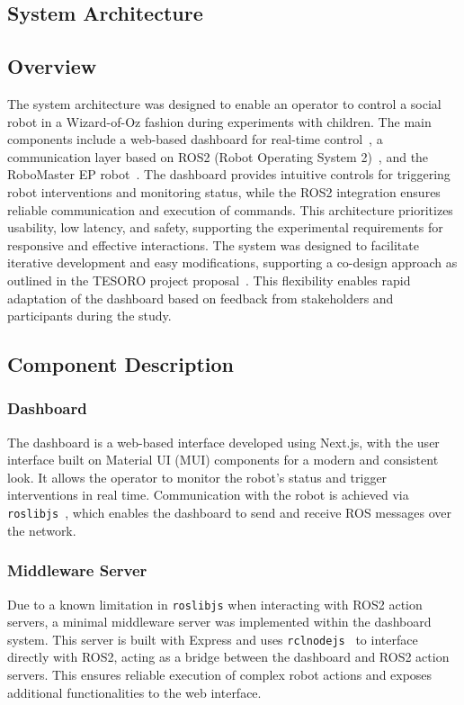 \documentclass[a4paper]{usiinfbachelorproject}
\begin{document}
\subsection{\textbf{System Architecture}}
\subsection*{\textbf{Overview}}
The system architecture was designed to enable an operator to control a social robot in a Wizard-of-Oz fashion during experiments with children.
The main components include a web-based dashboard for real-time control~\cite{frovaaa2025hogwarts}, a communication layer based on ROS2 (Robot Operating System 2)~\cite{ros2, frovaaa2025robomaster, frovaaa2025robomasterhri}, and the RoboMaster EP robot~\cite{djirobomasterep}.
The dashboard provides intuitive controls for triggering robot interventions and monitoring status, while the ROS2 integration ensures reliable communication and execution of commands.
This architecture prioritizes usability, low latency, and safety, supporting the experimental requirements for responsive and effective interactions.
The system was designed to facilitate iterative development and easy modifications, supporting a co-design approach as outlined in the TESORO project proposal~\cite{landoni2025tesoro}.
This flexibility enables rapid adaptation of the dashboard based on feedback from stakeholders and participants during the study.

\subsection{\textbf{Component Description}}
\subsubsection*{\textbf{Dashboard}}
The dashboard is a web-based interface developed using Next.js, with the user interface built on Material UI (MUI) components for a modern and consistent look.
It allows the operator to monitor the robot's status and trigger interventions in real time. Communication with the robot is achieved via \texttt{roslibjs}~\cite{roslibjs}, which enables the dashboard to send and receive ROS messages over the network.

\subsubsection*{\textbf{Middleware Server}}
Due to a known limitation in \texttt{roslibjs} when interacting with ROS2 action servers, a minimal middleware server was implemented within the dashboard system.
This server is built with Express and uses \texttt{rclnodejs}~\cite{rclnodejs} to interface directly with ROS2, acting as a bridge between the dashboard and ROS2 action servers.
This ensures reliable execution of complex robot actions and exposes additional functionalities to the web interface.
\end{document}
